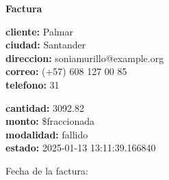 \documentclass{article}
\begin{document}
\begin{center}
    {\LARGE \textbf{Factura}}\\[1cm]
\end{center}

\textbf{cliente:} Palmar \\
\textbf{ciudad:} Santander \\
\textbf{direccion:} soniamurillo@example.org \\
\textbf{correo:} (+57) 608 127 00 85 \\
\textbf{telefono:} 31 \\

\vspace{0.5cm}

\textbf{cantidad:} 3092.82 \\
\textbf{monto:} \$fraccionada \\
\textbf{modalidad:} fallido \\
\textbf{estado:} 2025-01-13 13:11:39.166840 \\

\vspace{1cm}

Fecha de la factura: 
\end{document}
